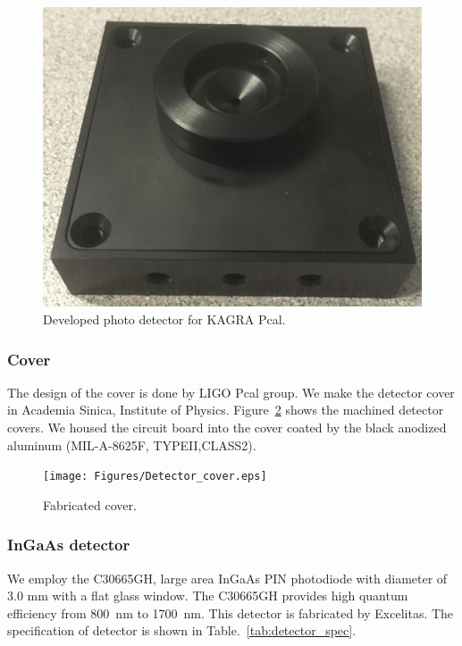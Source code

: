 \begin{figure}
\begin{center}
\includegraphics[width=12cm]{Figures/KAGRA_detector.eps}
\caption{Developed photo detector for KAGRA Pcal.} 
\label{fig:KAGRA_photodetector} 
\end{center}
\end{figure}

\subsubsection{Cover}
The design of the cover is done by LIGO Pcal group. We make the detector cover in Academia Sinica, Institute of Physics. Figure~\ref{fig:detector_cover} shows the machined detector covers. We housed the circuit board into the cover coated by the black anodized aluminum (MIL-A-8625F, TYPEII,CLASS2). 

\begin{figure}
\begin{center}
\texttt{[image: Figures/Detector\_cover.eps]}
\caption{Fabricated cover.} 
\label{fig:detector_cover} 
\end{center}
\end{figure}

\subsubsection{InGaAs detector}	
We employ the C30665GH, large area InGaAs PIN photodiode with diameter of 3.0 mm with a flat glass window. The C30665GH provides high quantum efficiency from 800~nm to 1700~nm. This detector is fabricated by Excelitas. The specification of detector is shown in Table.~\ref{tab:detector_spec}.

